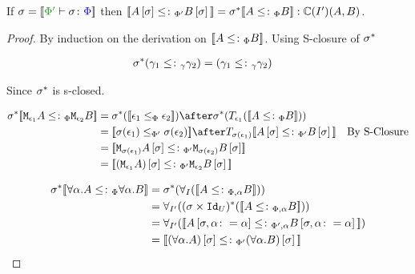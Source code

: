 \documentclass{report}
\begin{document}
\begin{theorem}
    If $\si = \deno{\typerelation{\P'}{\si}{\P}}$ then ${\bf [\![}A\left[\sigma\right]\leq\colon_{\Phi'} B\left[\sigma\right]{\bf ]\!]} = \sigma^*{\bf [\![}A\leq\colon_\Phi B{\bf ]\!]}: \mathbb{C}(I')(A, B)$.    
\end{theorem}
\begin{framed}
    
    \begin{proof}
        
        By induction on the derivation on ${\bf [\![}A\leq\colon_\Phi B{\bf ]\!]}$. Using S-closure of $\sigma^*$ 
        
        \begin{align*}
            \sigma^*(\gamma_1\leq\colon_\gamma\gamma_2) &= (\gamma_1\leq\colon_\gamma\gamma_2)
        \end{align*}
        
        Since $\sigma^*$ is s-closed.
        
        \begin{align*}
            \si\star\deno{\M{\e_1}{A} \subtypep \M{\e_2}{B}} & = \si\star(\deno{\e_1\subeffectp\e_2})\after\si\star(\T{\e_1}(\deno{A\subtypep B})) \\ 
             &= \deno{\si(\e_1)\subeffectpp\si(\e_2)} \after \T{\si(\e_1)}{\deno{A\ssi\subtypepp B\ssi}}\qt{By S-Closure}\\
             &= \deno{\M{\si(\e_1)}{A\ssi}\subtypepp\M{\si(\e_2)}{B\ssi}}\\
             &= \deno{(\M{\e_1}{A})\ssi\subtypepp\M{\e_2}{B}\ssi}\\
        \end{align*}
        
            \begin{align*}
                \si\star\deno{\all{\a}{A}\subtypep\all{\a}{B}} &= \si\star(\allI(\deno{A\subtypepa B})) \\
                &=\allII((\si\times\Id{U})\star(\deno{A\subtypepa B}))\\
                &=\allII(\deno{A\sub{\si,\a\setto\a}\subtypeppa B\sub{\si,\a\setto\a}})\\
                &= \deno{(\all{\a}{A})\ssi \subtypepp(\all{\a}{B})\ssi}\\
            \end{align*}
        

\end{proof}
\end{framed}
\end{document}
